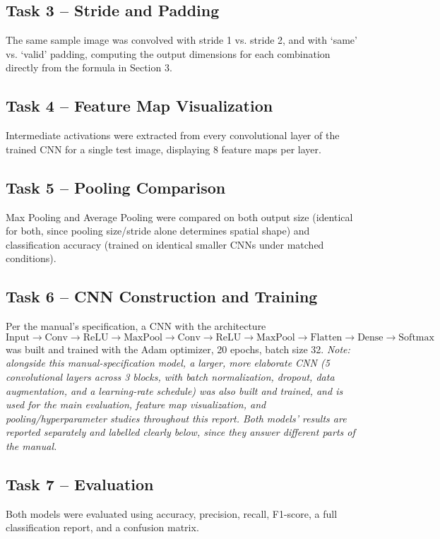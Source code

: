 \documentclass[11pt]{article}
\begin{document}
\subsection*{Task 3 -- Stride and Padding}
The same sample image was convolved with stride 1 vs. stride 2, and with `same' vs. `valid' padding, computing the output dimensions for each combination directly from the formula in Section 3.

\subsection*{Task 4 -- Feature Map Visualization}
Intermediate activations were extracted from every convolutional layer of the trained CNN for a single test image, displaying 8 feature maps per layer.

\subsection*{Task 5 -- Pooling Comparison}
Max Pooling and Average Pooling were compared on both output size (identical for both, since pooling size/stride alone determines spatial shape) and classification accuracy (trained on identical smaller CNNs under matched conditions).

\subsection*{Task 6 -- CNN Construction and Training}
Per the manual's specification, a CNN with the architecture
\[
\text{Input} \rightarrow \text{Conv} \rightarrow \text{ReLU} \rightarrow \text{MaxPool} \rightarrow \text{Conv} \rightarrow \text{ReLU} \rightarrow \text{MaxPool} \rightarrow \text{Flatten} \rightarrow \text{Dense} \rightarrow \text{Softmax}
\]
was built and trained with the Adam optimizer, 20 epochs, batch size 32. \textit{Note: alongside this manual-specification model, a larger, more elaborate CNN (5 convolutional layers across 3 blocks, with batch normalization, dropout, data augmentation, and a learning-rate schedule) was also built and trained, and is used for the main evaluation, feature map visualization, and pooling/hyperparameter studies throughout this report. Both models' results are reported separately and labelled clearly below, since they answer different parts of the manual.}

\subsection*{Task 7 -- Evaluation}
Both models were evaluated using accuracy, precision, recall, F1-score, a full classification report, and a confusion matrix.
\end{document}
